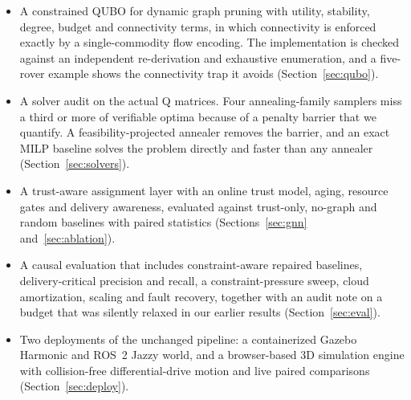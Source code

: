 \documentclass[11pt]{article}
\begin{document}
\begin{itemize}
\item A constrained QUBO for dynamic graph pruning with utility, stability,
degree, budget and connectivity terms, in which connectivity is enforced
exactly by a single-commodity flow encoding. The implementation is checked
against an independent re-derivation and exhaustive enumeration, and a
five-rover example shows the connectivity trap it avoids
(Section~\ref{sec:qubo}).
\item A solver audit on the actual Q matrices. Four annealing-family samplers
miss a third or more of verifiable optima because of a penalty barrier that
we quantify. A feasibility-projected annealer removes the barrier, and an
exact MILP baseline solves the problem directly and faster than any annealer
(Section~\ref{sec:solvers}).
\item A trust-aware assignment layer with an online trust model, aging,
resource gates and delivery awareness, evaluated against trust-only, no-graph
and random baselines with paired statistics (Sections~\ref{sec:gnn}
and~\ref{sec:ablation}).
\item A causal evaluation that includes constraint-aware repaired baselines,
delivery-critical precision and recall, a constraint-pressure sweep, cloud
amortization, scaling and fault recovery, together with an audit note on a
budget that was silently relaxed in our earlier results
(Section~\ref{sec:eval}).
\item Two deployments of the unchanged pipeline: a containerized Gazebo
Harmonic and ROS~2 Jazzy world, and a browser-based 3D simulation engine with
collision-free differential-drive motion and live paired comparisons
(Section~\ref{sec:deploy}).
\end{itemize}
\end{document}
